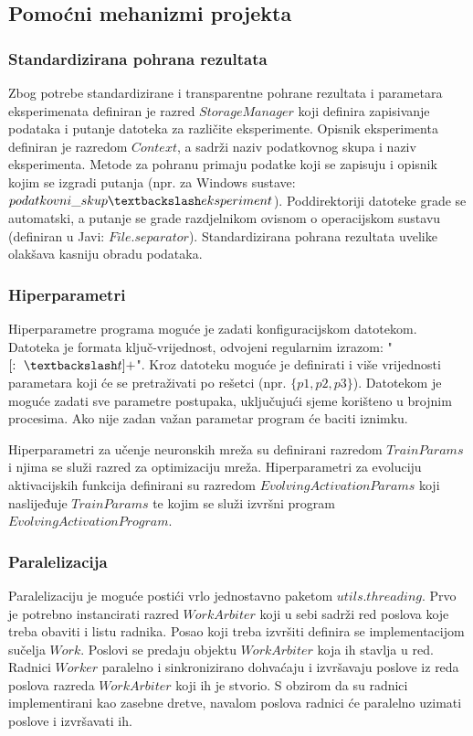 \documentclass[times, utf8, numeric, diplomski]{fer}
\begin{document}
\subsection{Pomoćni mehanizmi projekta}

\subsubsection{Standardizirana pohrana rezultata}
Zbog potrebe standardizirane i transparentne pohrane rezultata i parametara eksperimenata definiran je razred $StorageManager$ koji definira zapisivanje podataka i putanje datoteka za različite eksperimente. Opisnik eksperimenta definiran je razredom $Context$, a sadrži naziv podatkovnog skupa i naziv eksperimenta. Metode za pohranu primaju podatke koji se zapisuju i opisnik kojim se izgradi putanja (npr. za Windows sustave: $podatkovni\_skup \textbackslash eksperiment$). Poddirektoriji datoteke grade se automatski, a putanje se grade razdjelnikom ovisnom o operacijskom sustavu (definiran u Javi: $File.separator$). Standardizirana pohrana rezultata uvelike olakšava kasniju obradu podataka.

\subsubsection{Hiperparametri}
Hiperparametre programa moguće je zadati konfiguracijskom datotekom. Datoteka je formata ključ-vrijednost, odvojeni regularnim izrazom: "$[:\ \textbackslash t]+$". Kroz datoteku moguće je definirati i više vrijednosti parametara koji će se pretraživati po rešetci (npr. $\{p1,p2,p3\}$). Datotekom je moguće zadati sve parametre postupaka, uključujući sjeme korišteno u brojnim procesima. Ako nije zadan važan parametar program će baciti iznimku.

Hiperparametri za učenje neuronskih mreža su definirani razredom $TrainParams$ i njima se služi razred za optimizaciju mreža. Hiperparametri za evoluciju aktivacijskih funkcija definirani su razredom $EvolvingActivationParams$ koji naslijeđuje $TrainParams$ te kojim se služi izvršni program $EvolvingActivationProgram$.

\subsubsection{Paralelizacija}
Paralelizaciju je moguće postići vrlo jednostavno paketom $utils.threading$. Prvo je potrebno instancirati razred $WorkArbiter$ koji u sebi sadrži red poslova koje treba obaviti i listu radnika. Posao koji treba izvršiti definira se implementacijom sučelja $Work$. Poslovi se predaju objektu $WorkArbiter$ koja ih stavlja u red. Radnici $Worker$ paralelno i sinkronizirano dohvaćaju i izvršavaju poslove iz reda poslova razreda $WorkArbiter$ koji ih je stvorio. S obzirom da su radnici implementirani kao zasebne dretve, navalom poslova radnici će paralelno uzimati poslove i izvršavati ih.
\end{document}
